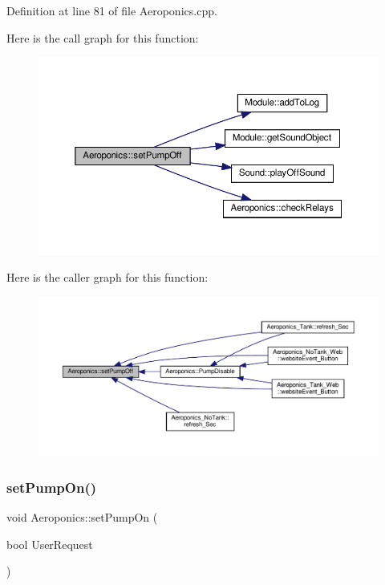 Definition at line 81 of file Aeroponics.\+cpp.

Here is the call graph for this function\+:
\nopagebreak
\begin{figure}[H]
\begin{center}
\leavevmode
\includegraphics[width=350pt]{class_aeroponics_a24561429d2ee5cf75f86edbe6e0a1d80_cgraph}
\end{center}
\end{figure}
Here is the caller graph for this function\+:
\nopagebreak
\begin{figure}[H]
\begin{center}
\leavevmode
\includegraphics[width=350pt]{class_aeroponics_a24561429d2ee5cf75f86edbe6e0a1d80_icgraph}
\end{center}
\end{figure}
\mbox{\label{class_aeroponics_ae4d0324ae9193294ed4a1ca5ab247537}} 
\subsubsection{\texorpdfstring{set\+Pump\+On()}{setPumpOn()}\hspace{0.1cm}{\footnotesize\ttfamily [1/2]}}
{\footnotesize\ttfamily void Aeroponics\+::set\+Pump\+On (\begin{DoxyParamCaption}\item[{bool}]{User\+Request }\end{DoxyParamCaption})\hspace{0.3cm}{\ttfamily [protected]}}

